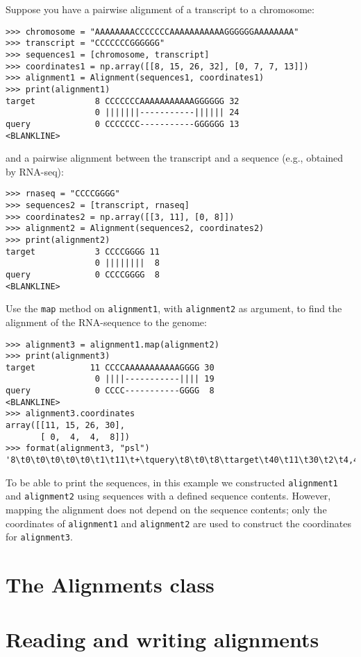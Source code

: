 Suppose you have a pairwise alignment of a transcript to a chromosome:
\begin{verbatim}
>>> chromosome = "AAAAAAAACCCCCCCAAAAAAAAAAAGGGGGGAAAAAAAA"
>>> transcript = "CCCCCCCGGGGGG"
>>> sequences1 = [chromosome, transcript]
>>> coordinates1 = np.array([[8, 15, 26, 32], [0, 7, 7, 13]])
>>> alignment1 = Alignment(sequences1, coordinates1)
>>> print(alignment1)
target            8 CCCCCCCAAAAAAAAAAAGGGGGG 32
                  0 |||||||-----------|||||| 24
query             0 CCCCCCC-----------GGGGGG 13
<BLANKLINE>
\end{verbatim}
and a pairwise alignment between the transcript and a sequence (e.g., obtained by RNA-seq):
\begin{verbatim}
>>> rnaseq = "CCCCGGGG"
>>> sequences2 = [transcript, rnaseq]
>>> coordinates2 = np.array([[3, 11], [0, 8]])
>>> alignment2 = Alignment(sequences2, coordinates2)
>>> print(alignment2)
target            3 CCCCGGGG 11
                  0 ||||||||  8
query             0 CCCCGGGG  8
<BLANKLINE>
\end{verbatim}
Use the \verb|map| method on \verb|alignment1|, with \verb|alignment2| as argument, to find the alignment of the RNA-sequence to the genome:
\begin{verbatim}
>>> alignment3 = alignment1.map(alignment2)
>>> print(alignment3)
target           11 CCCCAAAAAAAAAAAGGGG 30
                  0 ||||-----------|||| 19
query             0 CCCC-----------GGGG  8
<BLANKLINE>
>>> alignment3.coordinates
array([[11, 15, 26, 30],
       [ 0,  4,  4,  8]])
>>> format(alignment3, "psl")
'8\t0\t0\t0\t0\t0\t1\t11\t+\tquery\t8\t0\t8\ttarget\t40\t11\t30\t2\t4,4,\t0,4,\t11,26,\n'
\end{verbatim}
To be able to print the sequences, in this example  we constructed \verb|alignment1| and \verb|alignment2| using sequences with a defined sequence contents.
However, mapping the alignment does not depend on the sequence contents; only the coordinates of \verb|alignment1| and \verb|alignment2| are used to construct the coordinates for \verb|alignment3|.


\section{The Alignments class}
\label{sec:alignments}


\section{Reading and writing alignments}
\label{sec:alignmentparsers}

